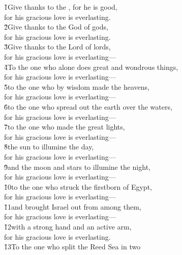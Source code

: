 \begin{poetry}
\poeml \v{1}Give thanks to the , for he is good, \\
\poemll    for his gracious love is everlasting. \\
\poeml \v{2}Give thanks to the God of gods, \\
\poemll    for his gracious love is everlasting. \\
\poeml \v{3}Give thanks to the Lord of lords, \\
\poemll    for his gracious love is everlasting--- \\
\poeml \v{4}To the one who alone does great and wondrous things, \\
\poemll    for his gracious love is everlasting--- \\
\poeml \v{5}to the one who by wisdom made the heavens, \\
\poemll    for his gracious love is everlasting--- \\
\poeml \v{6}to the one who spread out the earth over the waters, \\
\poemll    for his gracious love is everlasting--- \\
\poeml \v{7}to the one who made the great lights, \\
\poemll    for his gracious love is everlasting--- \\
\poeml \v{8}the sun to illumine the day, \\
\poemll    for his gracious love is everlasting--- \\
\poeml \v{9}and the moon and stars to illumine the night, \\
\poemll    for his gracious love is everlasting--- \\
\poeml \v{10}to the one who struck the firstborn of Egypt, \\
\poemll    for his gracious love is everlasting--- \\
\poeml \v{11}and brought Israel out from among them, \\
\poemll    for his gracious love is everlasting--- \\
\poeml \v{12}with a strong hand and an active arm, \\
\poemll    for his gracious love is everlasting. \\
\poeml \v{13}To the one who split the Reed Sea in two \\

\end{poetry}

